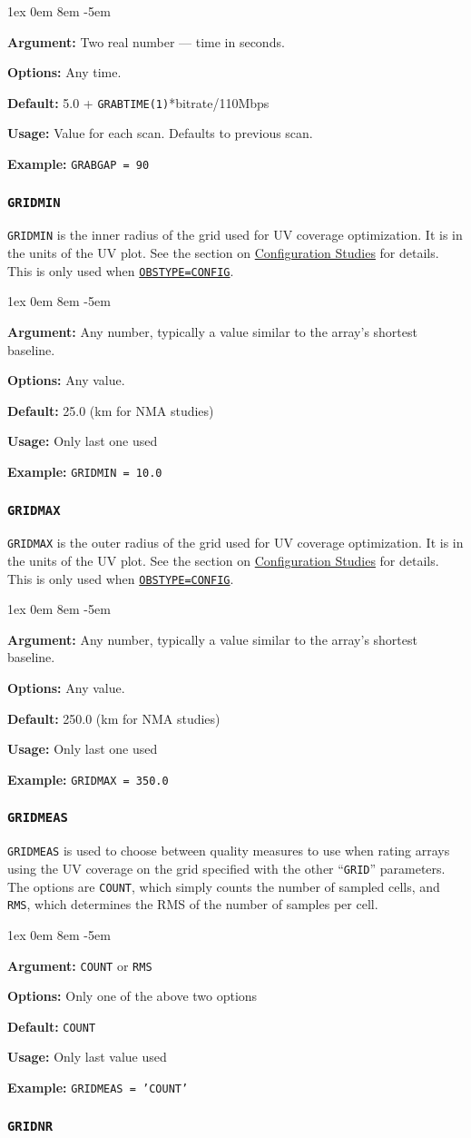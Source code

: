 \documentclass{report}
\newcommand{\rcwbox}[5]{
  \begin{list}{}{\parsep 1ex  \itemsep 0em
                 \leftmargin 8em  \itemindent -5em }
    \item {\bf Argument:} #1
    \item {\bf Options:}  #2
    \item {\bf Default:}  #3
    \item {\bf Usage:}    #4
    \item {\bf Example:}  #5
  \end{list}
}
\begin{document}
\rcwbox
{ Two real number --- time in seconds.}
{ Any time.}
{5.0 + {\tt GRABTIME(1)}*bitrate/110Mbps}
{Value for each scan.  Defaults to previous scan.}
{{\tt GRABGAP = 90 }}

\subsubsection{\label{MP:GRIDMIN}{\tt GRIDMIN}}

{\tt GRIDMIN} is the inner radius of the grid used for UV
coverage optimization.  It is in the units of the UV plot.
See the section on 
{\hyperref[SEC:CONFIG]{Configuration Studies}}
for details.  This is only used when
{\hyperref[MP:OBSTYPE]{{\tt OBSTYPE=CONFIG}}}.

\rcwbox
{Any number, typically a value similar to the array's shortest baseline.}
{Any value.}
{25.0 (km for NMA studies)}
{Only last one used}
{{\tt GRIDMIN = 10.0}}

\subsubsection{\label{MP:GRIDMAX}{\tt GRIDMAX}}

{\tt GRIDMAX} is the outer radius of the grid used for UV
coverage optimization.  It is in the units of the UV plot.
See the section on 
{\hyperref[SEC:CONFIG]{Configuration Studies}} for details.
This is only used when
{\hyperref[MP:OBSTYPE]{{\tt OBSTYPE=CONFIG}}}.

\rcwbox
{Any number, typically a value similar to the array's shortest baseline.}
{Any value.}
{250.0 (km for NMA studies)}
{Only last one used}
{{\tt GRIDMAX = 350.0}}

\subsubsection{\label{MP:GRIDMEAS}{\tt GRIDMEAS}}

{\tt GRIDMEAS} is used to choose between quality measures to use
when rating arrays using the UV coverage on the grid specified
with the other ``{\tt GRID}'' parameters.  The options are
{\tt COUNT}, which simply counts the number of sampled cells,
and {\tt RMS}, which determines the RMS of the number of samples
per cell.

\rcwbox
{{\tt COUNT} or {\tt RMS}}
{Only one of the above two options}
{{\tt COUNT}}
{Only last value used}
{{\tt GRIDMEAS = 'COUNT'}}


\subsubsection{\label{MP:GRIDNR}{\tt GRIDNR}}
\end{document}
